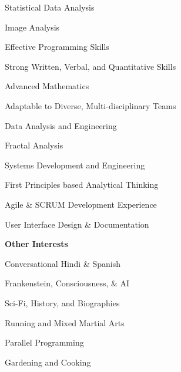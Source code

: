 \documentclass[letterpaper,final]{memoir}
\newcommand{\LargeSep}{\vspace{1.3em}}
\newcommand{\Sep}{\vspace{1.0em}}
\newcommand{\SmallSep}{\vspace{0.4em}}
\newcommand{\CVItem}[1]
	{\textbf{\color{Blue} #1}}
\begin{document}
\begin{multicols}{2}

    \begin{compactitem}[\color{Blue}$\circ$]

        \item Statistical Data Analysis
        \SmallSep
        \item Image Analysis
        \SmallSep
        \item Effective Programming Skills
        \SmallSep
        \item Strong Written, Verbal, and Quantitative Skills
        \SmallSep
        \item Advanced Mathematics
        \SmallSep
        \item Adaptable to Diverse, Multi-disciplinary Teams
        \SmallSep
        \item Data Analysis and Engineering
        \SmallSep
        \item Fractal Analysis
        \SmallSep
        \item Systems Development and Engineering
        \SmallSep
        \item First Principles based Analytical Thinking
        \SmallSep
        \item Agile \& SCRUM Development Experience
        \SmallSep
        \item User Interface Design \&  Documentation
        
	\end{compactitem}

\end{multicols}

\Sep

\CVItem{Other Interests}
\Sep

\begin{multicols}{2}

    \begin{compactitem}[\color{Blue}$\circ$] 
        
        \item Conversational  Hindi \& Spanish
        \SmallSep
        \item Frankenstein, Consciousness, \& AI
        \SmallSep
        \item Sci-Fi, History, and Biographies
        \SmallSep
        \item Running and Mixed Martial Arts
        \SmallSep
        \item Parallel Programming
        \SmallSep
        \item Gardening and Cooking
        

	\end{compactitem}
\end{multicols}
\LargeSep
\end{document}

